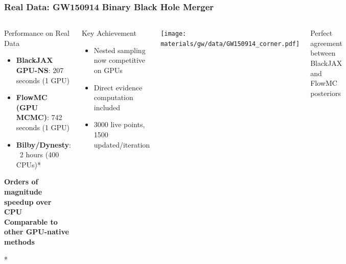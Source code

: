 \documentclass[aspectratio=169]{beamer}
\begin{document}
\begin{frame}
    \frametitle{Real Data: GW150914 Binary Black Hole Merger}
    \begin{columns}
        \begin{block}{Performance on Real Data}
            \begin{itemize}
                \item \textbf{BlackJAX GPU-NS}: 207 seconds (1 GPU)
                \item \textbf{FlowMC (GPU MCMC)}: 742 seconds (1 GPU)
                \item \textbf{Bilby/Dynesty}: ~2 hours (400 CPUs)*
            \end{itemize}
            \vspace{5pt}
            \begin{center}
                \textbf{Orders of magnitude speedup over CPU}\\
                \textbf{Comparable to other GPU-native methods}
            \end{center}
            \vspace{5pt}
            \small{*}
        \end{block}
        \begin{block}{Key Achievement}
            \begin{itemize}
                \item Nested sampling now competitive on GPUs
                \item Direct evidence computation included
                \item 3000 live points, 1500 updated/iteration
            \end{itemize}
        \end{block}
        \texttt{[image: materials/gw/data/GW150914\_corner.pdf]}
        \vspace{5pt}
        \begin{center}
            \small{Perfect agreement between BlackJAX\\and FlowMC posteriors}
        \end{center}
    \end{columns}
\end{frame}
\end{document}
